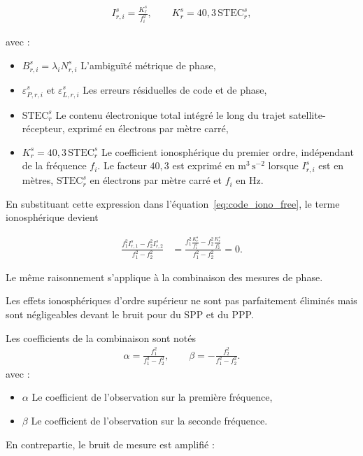 \begin{align}
I_{r,i}^s
=
\frac{K_r^s}{f_i^2},
\qquad
K_r^s=40{,}3\,\mathrm{STEC}_r^s,
\end{align}

avec :

\begin{itemize}
    \item $B_{r,i}^s=\lambda_iN_{r,i}^s$ L'ambiguïté métrique de phase,
    \item $\varepsilon_{P,r,i}^s$ et $\varepsilon_{L,r,i}^s$ Les erreurs
    résiduelles de code et de phase,
    \item $\mathrm{STEC}_r^s$ Le contenu électronique total intégré le long
    du trajet satellite-récepteur, exprimé en électrons par mètre carré,
    \item $K_r^s=40{,}3\,\mathrm{STEC}_r^s$ Le coefficient ionosphérique du
    premier ordre, indépendant de la fréquence $f_i$. Le facteur $40{,}3$
    est exprimé en $\mathrm{m^3\,s^{-2}}$ lorsque $I_{r,i}^s$ est en mètres,
    $\mathrm{STEC}_r^s$ en électrons par mètre carré et $f_i$ en Hz.
\end{itemize}

En substituant cette expression dans l'équation~\eqref{eq:code_iono_free},
le terme ionosphérique devient

\begin{align}
\frac{
f_1^2I_{r,1}^s-f_2^2I_{r,2}^s
}{
f_1^2-f_2^2
}
&=
\frac{
f_1^2\frac{K_r^s}{f_1^2}
-
f_2^2\frac{K_r^s}{f_2^2}
}{
f_1^2-f_2^2
}
=
0.
\end{align}

Le même raisonnement s'applique à la combinaison des mesures de phase.

Les effets ionosphériques d'ordre
supérieur ne sont pas parfaitement éliminés mais sont négligeables devant le bruit pour du SPP et du PPP.



Les coefficients de la combinaison sont notés
\begin{align}
\alpha=\frac{f_1^2}{f_1^2-f_2^2},\qquad
\beta=-\frac{f_2^2}{f_1^2-f_2^2}.
\label{new:if}
\end{align}
avec :
\begin{itemize}
\item $\alpha$ Le coefficient de l'observation sur la première fréquence,
\item $\beta$ Le coefficient de l'observation sur la seconde fréquence.
\end{itemize}

En contrepartie, le bruit de mesure est amplifié :

